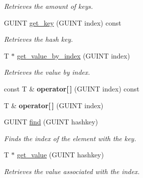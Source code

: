 \begin{DoxyCompactItemize}
\begin{DoxyCompactList}\small\item\em Retrieves the amount of keys. \end{DoxyCompactList}\item 
\mbox{\label{classgim__hash__table_aa9f8b2ae1ac505ed5dfe73b83510dad0}} 
G\+U\+I\+NT \hyperlink{classgim__hash__table_aa9f8b2ae1ac505ed5dfe73b83510dad0}{get\+\_\+key} (G\+U\+I\+NT index) const
\begin{DoxyCompactList}\small\item\em Retrieves the hash key. \end{DoxyCompactList}\item 
\mbox{\label{classgim__hash__table_ab5ec54c3096e790e8c7ae570300df95d}} 
T $\ast$ \hyperlink{classgim__hash__table_ab5ec54c3096e790e8c7ae570300df95d}{get\+\_\+value\+\_\+by\+\_\+index} (G\+U\+I\+NT index)
\begin{DoxyCompactList}\small\item\em Retrieves the value by index. \end{DoxyCompactList}\item 
\mbox{\label{classgim__hash__table_a8462bb3aa6342465fc54659648f8c8c9}} 
const T \& {\bfseries operator\mbox{[}$\,$\mbox{]}} (G\+U\+I\+NT index) const
\item 
\mbox{\label{classgim__hash__table_a0df819cc9b510d933132f2e5d5f87488}} 
T \& {\bfseries operator\mbox{[}$\,$\mbox{]}} (G\+U\+I\+NT index)
\item 
G\+U\+I\+NT \hyperlink{classgim__hash__table_a14261b2d7de34188f8bc5179e4d60760}{find} (G\+U\+I\+NT hashkey)
\begin{DoxyCompactList}\small\item\em Finds the index of the element with the key. \end{DoxyCompactList}\item 
T $\ast$ \hyperlink{classgim__hash__table_a40b5c46a0117da3948cd1b093f185321}{get\+\_\+value} (G\+U\+I\+NT hashkey)
\begin{DoxyCompactList}\small\item\em Retrieves the value associated with the index. \end{DoxyCompactList}\item 
\mbox{\label{classgim__hash__table_abd4a9523a14496c9e3eacd7f790dad2c}} 

\end{DoxyCompactItemize}
